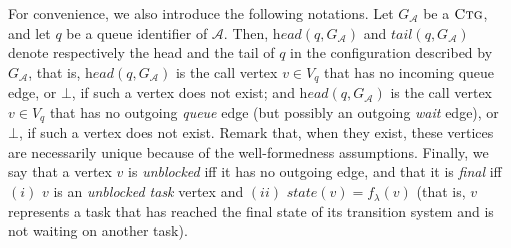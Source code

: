 \documentclass[runningheads,oribibl,]{article}
\newcommand{\Aa}{\ensuremath{\mathcal{A}}\xspace}
\newcommand{\Graph}{\ensuremath{G}}
\newcommand{\state}{\ensuremath{\textit{state}}}
\newcommand{\head}{\ensuremath{\textit{head}}}
\newcommand{\tail}{\ensuremath{\textit{tail}}}
\newcommand{\ctg}{\ensuremath{\textsc{Ctg}}\xspace}
\begin{document}
For convenience, we also introduce the following notations. Let
$\Graph_\Aa$ be a \ctg, and let $q$ be a queue identifier of
$\Aa$. Then, $\head(q,\Graph_\Aa)$ and $\tail(q,\Graph_\Aa)$ denote
respectively the head and the tail of $q$ in the configuration
described by $\Graph_\Aa$, that is, $\head(q,\Graph_\Aa)$ is the call
vertex $v\in V_q$ that has no incoming queue edge, or $\bot$, if such
a vertex does not exist; and $\head(q,\Graph_\Aa)$ is the call vertex
$v\in V_q$ that has no outgoing \emph{queue} edge (but possibly an
outgoing \emph{wait} edge), or $\bot$, if such a vertex does not
exist. Remark that, when they exist, these vertices are necessarily
unique because of the well-formedness assumptions. Finally, we say
that a vertex $v$ is \emph{unblocked} iff it has no outgoing edge, and
that it is \emph{final} iff $(i)$ $v$ is an \emph{unblocked task}
vertex and $(ii)$ $\state(v)=f_\lambda(v)$ (that is, $v$ represents a
task that has reached the final state of its transition system and is
not waiting on another task).
\end{document}
